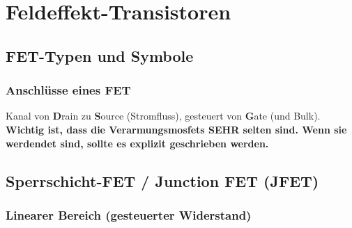 \section{Feldeffekt-Transistoren}

\subsection{FET-Typen und Symbole}



\subsubsection{Anschlüsse eines FET}

Kanal von \textbf{D}rain zu \textbf{S}ource (Stromfluss), gesteuert von \textbf{G}ate (und Bulk).\\
\textbf{Wichtig ist, dass die Verarmungsmosfets SEHR selten sind. Wenn sie werdendet sind, sollte es explizit geschrieben werden.}


\subsection{Sperrschicht-FET / Junction FET (JFET)}

%


\subsubsection{Linearer Bereich (gesteuerter Widerstand)}

